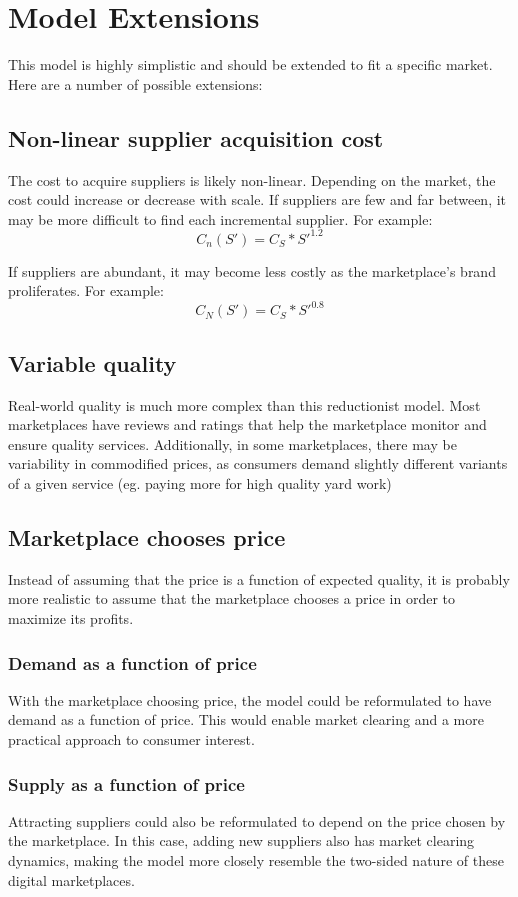 \section{Model Extensions}

This model is highly simplistic and should be extended to fit a specific market. Here are a number of possible extensions:

\subsection{Non-linear supplier acquisition cost}
The cost to acquire suppliers is likely non-linear. Depending on the market, the cost could increase or decrease with scale.
If suppliers are few and far between, it may be more difficult to find each incremental supplier. For example:
\[ C_n(S') = C_S*S'^1.2 \]

If suppliers are abundant, it may become less costly as the marketplace's brand proliferates. For example:
\[ C_N(S') = C_S*S'^0.8 \]

\subsection{Variable quality}
Real-world quality is much more complex than this reductionist model. Most marketplaces have reviews and ratings that help the marketplace monitor and ensure quality services. Additionally, in some marketplaces, there may be variability in commodified prices, as consumers demand slightly different variants of a given service (eg. paying more for high quality yard work)

\subsection{Marketplace chooses price}

Instead of assuming that the price is a function of expected quality, it is probably more realistic to assume that the marketplace chooses a price in order to maximize its profits.

\subsubsection{Demand as a function of price}

With the marketplace choosing price, the model could be reformulated to have demand as a function of price. This would enable market clearing and a more practical approach to consumer interest. 

\subsubsection{Supply as a function of price}

Attracting suppliers could also be reformulated to depend on the price chosen by the marketplace. In this case, adding new suppliers also has market clearing dynamics, making the model more closely resemble the two-sided nature of these digital marketplaces.

